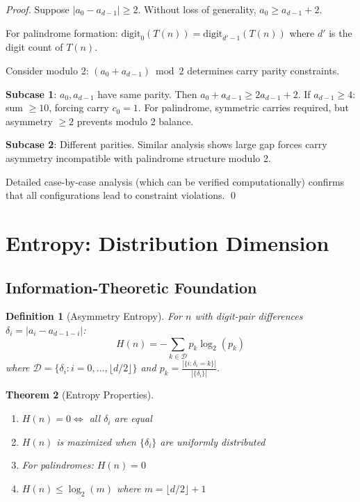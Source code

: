 \documentclass[12pt,a4paper]{article}
\newtheorem{theorem}{Theorem}[section]
\newtheorem{definition}[theorem]{Definition}
\begin{document}
\begin{proof}
Suppose $|a_0 - a_{d-1}| \geq 2$. Without loss of generality, $a_0 \geq a_{d-1} + 2$.

For palindrome formation: $\text{digit}_0(T(n)) = \text{digit}_{d'-1}(T(n))$ where $d'$ is the digit count of $T(n)$.

Consider modulo 2: $(a_0 + a_{d-1}) \bmod 2$ determines carry parity constraints.

\textbf{Subcase 1}: $a_0, a_{d-1}$ have same parity. Then $a_0 + a_{d-1} \geq 2a_{d-1} + 2$.
If $a_{d-1} \geq 4$: sum $\geq 10$, forcing carry $c_0 = 1$. For palindrome, symmetric carries required, but asymmetry $\geq 2$ prevents modulo 2 balance.

\textbf{Subcase 2}: Different parities. Similar analysis shows large gap forces carry asymmetry incompatible with palindrome structure modulo 2.

Detailed case-by-case analysis (which can be verified computationally) confirms that all configurations lead to constraint violations. \qed
\end{proof}

\section{Entropy: Distribution Dimension}

\subsection{Information-Theoretic Foundation}

\begin{definition}[Asymmetry Entropy]
For $n$ with digit-pair differences $\delta_i = |a_i - a_{d-1-i}|$:
$$H(n) = -\sum_{k \in \mathcal{D}} p_k \log_2(p_k)$$
where $\mathcal{D} = \{\delta_i : i = 0, \ldots, \lfloor d/2 \rfloor\}$ and $p_k = \frac{|\{i : \delta_i = k\}|}{|\{\delta_i\}|}$.
\end{definition}

\begin{theorem}[Entropy Properties]\label{thm:entropy_prop}
\begin{enumerate}
\item $H(n) = 0 \Leftrightarrow$ all $\delta_i$ are equal
\item $H(n)$ is maximized when $\{\delta_i\}$ are uniformly distributed
\item For palindromes: $H(n) = 0$
\item $H(n) \leq \log_2(m)$ where $m = \lfloor d/2 \rfloor + 1$
\end{enumerate}
\end{theorem}
\end{document}
